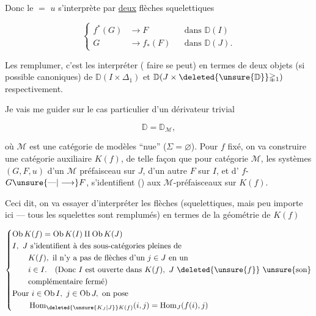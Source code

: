 Donc le $=$ $u$ s'interprète par \uline{deux} flèches squelettiques

\[
\left\{\begin{aligned}
f^*(G)&\longrightarrow F&&\text{dans }\mathbb D(I)\\
G&\longrightarrow f_*(F)&&\text{dans }\mathbb D(J).
\end{aligned}\right.
\tag*{(1)}
\]

Les remplumer, c'est les interpréter ( faire se peut) en termes de deux objets (si possible canoniques) de $\mathbb D(I\times\mathbb{\Delta}_1)$ et $\mathbb D(J\times\deleted{\unsure{\mathbb D}}\mathbb{\Delta}_1)$ respectivement.

Je vais me guider sur le cas particulier d'un dérivateur trivial

\[
\mathbb D=\mathbb D_{\mathcal M},
\]

où $\mathcal M$ est une catégorie de modèles ``nue'' ($\Sigma=\varnothing$).
Pour $f$ fixé, on va construire une catégorie auxiliaire $K(f)$, de telle façon que pour  catégorie $\mathcal M$, les systèmes $(G,F,u)$ d'un $\mathcal M$ préfaisceau  sur $J$, d'un autre $F$ sur $I$, et d' $f$- $G\unsure{\text{---}|\longrightarrow}F$, s'identifient () aux $\mathcal M$-préfaisceaux sur $K(f)$.

Ceci dit, on va essayer d'interpréter les flèches  (squelettiques, mais peu importe ici --- tous les squelettes sont  remplumés) en termes de la géométrie de $K(f)$

\[
\left\{\begin{aligned}
&\mathrm{Ob}\,K(f)=\mathrm{Ob}\,K(I)\amalg\mathrm{Ob}\,K(J)\\
&I,\ J\ \text{s'identifient à des sous-catégories pleines de}\\
&\qquad K(f),\ \text{il n'y a pas de flèches d'un }j\in J\text{ en un}\\
&\qquad i\in I.\quad(\text{Donc }I\text{ est ouverte dans }K(f),\ J\ \deleted{\unsure{f}}\ \text{\unsure{son}}\\
&\qquad\text{complémentaire fermé})\\
&\text{Pour }i\in\mathrm{Ob}\,I,\ j\in\mathrm{Ob}\,J,\ \text{on pose}\\
&\qquad\operatorname{Hom}_{\deleted{\unsure{K_J|J}}K(f)}(i,j)=\operatorname{Hom}_J(f(i),j)
\end{aligned}\right.
\]

